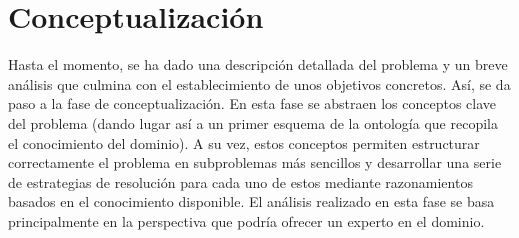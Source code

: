 
\section{Conceptualización} \label{sec:conceptualizacion}

Hasta el momento, se ha dado una descripción detallada del problema y un breve 
análisis que culmina con el establecimiento de unos objetivos concretos. 
Así, se da paso a la fase de conceptualización. En esta fase se abstraen los 
conceptos clave del problema (dando lugar así a un primer esquema de la 
ontología que recopila el conocimiento del dominio). A su vez, estos conceptos 
permiten estructurar correctamente el problema en subproblemas más sencillos 
y desarrollar una serie de estrategias de resolución para cada uno de estos
mediante razonamientos basados en el conocimiento disponible. El análisis 
realizado en esta fase se basa principalmente en la perspectiva que podría 
ofrecer un experto en el dominio.







%

\clearpage


